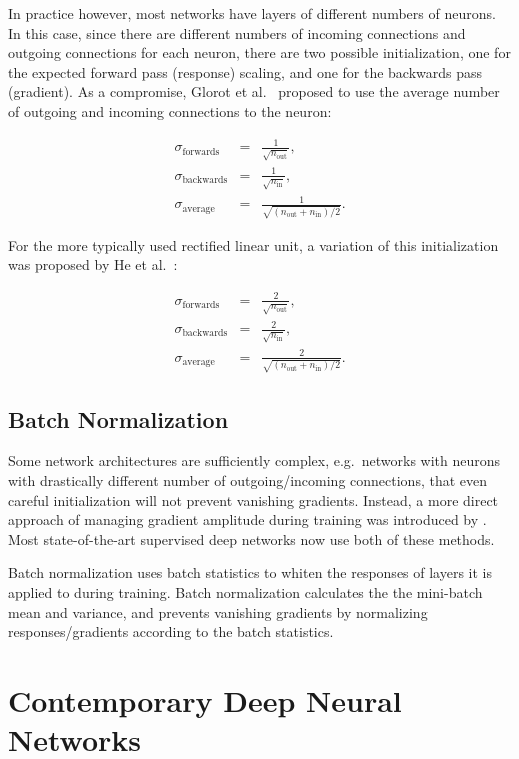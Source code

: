 \documentclass[thesis]{subfiles}
\begin{document}
In practice however, most networks have layers of different numbers of neurons. In this case, since there are different numbers of incoming connections and outgoing connections for each neuron, there are two possible initialization, one for the expected forward pass (response) scaling, and one for the backwards pass (gradient). As a compromise, Glorot et al.~\cite{glorot2010understanding} proposed to use the average number of outgoing and incoming connections to the neuron:

\begin{eqnarray*}
	\sigma_{\textrm{forwards}} &=& \frac{1}{\sqrt{n_{\text{out}}}},\\
	\sigma_{\textrm{backwards}} &=& \frac{1}{\sqrt{n_{\text{in}}}},\\
	\sigma_{\textrm{average}} &=& \frac{1}{\sqrt{(n_{\text{out}} + n_{\text{in}})/2}}.
\end{eqnarray*}

For the more typically used rectified linear unit, a variation of this initialization was proposed by He et al.~\cite{he2015delving}:

\begin{eqnarray*}
	\sigma_{\textrm{forwards}} &=& \frac{2}{\sqrt{n_{\text{out}}}},\\
	\sigma_{\textrm{backwards}} &=& \frac{2}{\sqrt{n_{\text{in}}}},\\
	\sigma_{\textrm{average}} &=& \frac{2}{\sqrt{(n_{\text{out}} + n_{\text{in}})/2}}.
\end{eqnarray*}

\subsection{Batch Normalization}
Some network architectures are sufficiently complex, e.g.~networks with neurons with drastically different number of outgoing/incoming connections, that even careful initialization will not prevent vanishing gradients. Instead, a more direct approach of managing gradient amplitude during training was introduced by \citet{Ioffe2015}. Most state-of-the-art supervised deep networks now use both of these methods.

Batch normalization uses batch statistics to whiten the responses of layers it is applied to during training. Batch normalization calculates the the mini-batch mean and variance, and prevents vanishing gradients by normalizing responses/gradients according to the batch statistics. 

\section{Contemporary Deep Neural Networks}
\end{document}
